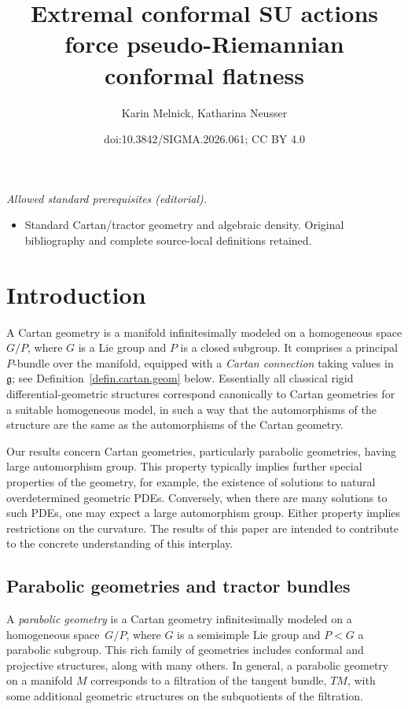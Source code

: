 \documentclass[10pt,a4paper]{amsart}
\title{Extremal conformal SU actions force pseudo-Riemannian conformal flatness}
\author{Karin Melnick, Katharina Neusser}
\date{doi:10.3842/SIGMA.2026.061; CC BY 4.0}
\numberwithin{equation}{section}
\theoremstyle{definition}
\newcommand{\lieg}{\mathfrak{g}}
\begin{document}
\maketitle
\noindent\textit{Allowed standard prerequisites (editorial).}\begin{itemize}
\item Standard Cartan/tractor geometry and algebraic density. Original bibliography and complete source-local definitions retained.
\end{itemize}\medskip
\section{Introduction}
A Cartan geometry is a manifold infinitesimally modeled on a
homogeneous space $G/P$, where $G$ is a Lie group and $P$ is a closed
subgroup. It comprises a principal $P$-bundle over the manifold,
equipped with a \emph{Cartan connection} taking values in $\lieg$; see Definition~\ref{defin.cartan.geom} below. Essentially all classical
rigid differential-geometric structures correspond canonically to
Cartan geometries for a suitable homogeneous model, in such a way that the
automorphisms of the structure are the same as the automorphisms of
the Cartan geometry.

Our results concern Cartan geometries, particularly parabolic geometries, having large
automorphism group. This property typically implies further special properties of the geometry, for example,
the existence of solutions to natural overdetermined geometric PDEs. Conversely,
when there are many solutions to such PDEs, one may expect a large automorphism group. Either property implies restrictions on the curvature. The results of this paper are intended to contribute to the concrete understanding of this interplay.

\subsection{Parabolic geometries and tractor bundles}
\label{sec.intro.tractor}

A \emph{parabolic geometry} is a Cartan geometry infinitesimally modeled
on a homogeneous space~$G/P$, where $G$ is a semisimple Lie group and
$P < G$ a parabolic subgroup. This rich family of geometries includes
conformal and projective structures, along with many others. In general, a parabolic
geometry on a manifold $M$ corresponds to a filtration of the tangent
bundle, $TM$, with some additional geometric structures on the
subquotients of the filtration.
\end{document}
